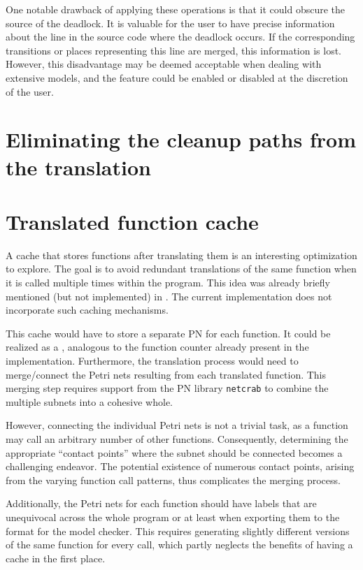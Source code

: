 One notable drawback of applying these operations is
that it could obscure the source of the deadlock.
It is valuable for the user to have precise information
about the line in the source code where the deadlock occurs.
If the corresponding transitions or places representing this line are merged,
this information is lost.
However, this disadvantage may be deemed acceptable when dealing with extensive models,
and the feature could be enabled or disabled at the discretion of the user.

\section{Eliminating the cleanup paths from the translation}
\label{sec:future-work-no-cleanup}

\section{Translated function cache}
\label{sec:future-work-function-cache}

A cache that stores functions after translating them is
an interesting optimization to explore.
The goal is to avoid redundant translations of the same function
when it is called multiple times within the program.
This idea was already briefly mentioned (but not implemented) in \cite{meyer2020}.
The current implementation does not incorporate such caching mechanisms.

This cache would have to store a separate \acrshort{PN} for each function.
It could be realized as a ,
analogous to the function counter already present in the implementation.
Furthermore, the translation process would need to merge/connect
the Petri nets resulting from each translated function.
This merging step requires support from the \acrshort{PN} library \texttt{netcrab}
to combine the multiple subnets into a cohesive whole.

However, connecting the individual Petri nets is not a trivial task,
as a function may call an arbitrary number of other functions.
Consequently, determining the appropriate ``contact points''
where the subnet should be connected becomes a challenging endeavor.
The potential existence of numerous contact points,
arising from the varying function call patterns, thus complicates the merging process.

Additionally, the Petri nets for each function should have labels that are unequivocal
across the whole program or at least when exporting them to the format for the model checker.
This requires generating slightly different versions of the same function for every call,
which partly neglects the benefits of having a cache in the first place.

